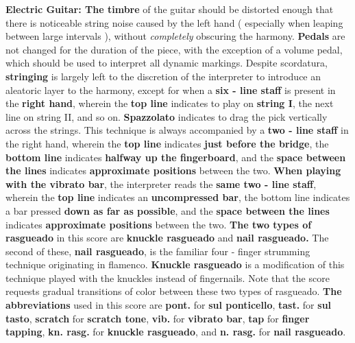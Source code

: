 \documentclass[12pt]{article}
\newcommand*\circled[1]{\tikz[baseline=(char.base)]{
            \node[shape=circle,draw,inner sep=1pt] (char) {#1};}}
\begin{document}
\begingroup
\textbf{Electric Guitar: \circled{1} The timbre} of the guitar should be distorted enough that there is noticeable string noise caused by the left hand ( especially when leaping between large intervals ), without \textit{completely} obscuring the harmony. \textbf{\circled{2} Pedals} are not changed for the duration of the piece, with the exception of a volume pedal, which should be used to interpret all dynamic markings. \textbf{\circled{3}} Despite scordatura, \textbf{stringing} is largely left to the discretion of the interpreter to introduce an aleatoric layer to the harmony, except for when a \textbf{six - line staff} is present in the \textbf{right hand}, wherein the \textbf{top line} indicates to play on \textbf{string I}, the next line on string II, and so on. \textbf{\circled{4} Spazzolato} indicates to drag the pick vertically across the strings. This technique is always accompanied by a \textbf{two - line staff} in the right hand, wherein the \textbf{top line} indicates \textbf{just before the bridge}, the \textbf{bottom line} indicates \textbf{halfway up the fingerboard}, and the \textbf{space between the lines} indicates \textbf{approximate positions} between the two. \textbf{\circled{5} When playing with the vibrato bar}, the interpreter reads the \textbf{same two - line staff}, wherein the \textbf{top line} indicates an \textbf{uncompressed bar}, the bottom line indicates a bar pressed \textbf{down as far as possible}, and the \textbf{space between the lines} indicates \textbf{approximate positions} between the two. \textbf{\circled{6} The two types of rasgueado} in this score are \textbf{knuckle rasgueado} and \textbf{nail rasgueado.} The second of these, \textbf{nail rasgueado}, is the familiar four - finger strumming technique originating in flamenco. \textbf{Knuckle rasgueado} is a modification of this technique played with the knuckles instead of fingernails. Note that the score requests gradual transitions of color between these two types of rasgueado. \textbf{\circled{7} The abbreviations} used in this score are \textbf{pont.} for \textbf{sul ponticello}, \textbf{tast.} for \textbf{sul tasto}, \textbf{scratch} for \textbf{scratch tone}, \textbf{vib.} for \textbf{vibrato bar}, \textbf{tap} for \textbf{finger tapping}, \textbf{kn. rasg.} for \textbf{knuckle rasgueado}, and \textbf{n. rasg.} for \textbf{nail rasgueado}.
\endgroup
\end{document}
